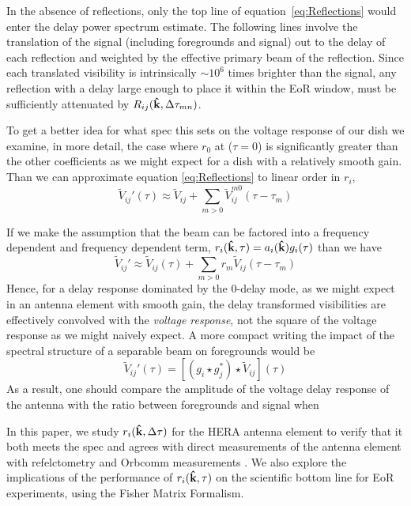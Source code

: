 \documentclass[preprint]{emulateapj}
\begin{document}
In the absence of reflections, only the top line of equation~\ref{eq:Reflections} would enter the delay power spectrum estimate. The following lines involve the translation of the signal (including foregrounds and signal) out to the delay of each reflection and weighted by the effective primary beam of the reflection. Since each translated visibility is intrinsically $\sim 10^6$ times brighter than the signal, any reflection with a delay large enough to place it within the EoR window, must be sufficiently attenuated by $R_{ij}({\bf \hat{k}},\Delta \tau_{mn})$.%

To get a better idea for what spec this sets on the voltage response of our dish we examine, in more detail, the case where $r_0$ at ($\tau=0$) is significantly greater than the other coefficients as we might expect for a dish with a relatively smooth gain. Than we can approximate equation \ref{eq:Reflections} to linear order in $r_i$,
\begin{equation}
\widetilde{V}_{ij}'(\tau) \approx \widetilde{V}_{ij} + \sum_{m>0} \widetilde{V}_{ij}^{m0} (\tau -  \tau_m)
\end{equation}



If we make the assumption that the beam can be factored into a frequency dependent and frequency dependent term, $r_i({\bf \hat{k}},\tau) = a_i({\bf \hat{k}}) g_i(\tau)$ than we have
\begin{equation}
\widetilde{V}_{ij}' \approx \widetilde{V}_{ij}(\tau) + \sum_{m>0} r_m \widetilde{V}_{ij}(\tau - \tau_m)
\end{equation}
 Hence, for a delay response dominated by the $0$-delay mode, as we might expect in an antenna element with smooth gain, the delay transformed visibilities are effectively convolved with the {\it voltage response}, not the square of the voltage response as we might naively expect. A more compact writing the impact of the spectral structure of a separable beam on foregrounds would be
 \begin{equation}
 	\widetilde{V}_{ij}'(\tau) = \left[ (g_i \star g_j^*) \star \widetilde{V}_{ij}\right](\tau)
 \end{equation}
 As a result, one should compare the amplitude of the voltage delay response of the antenna with the ratio between foregrounds and signal when 


 In this paper, we study $r_i({\bf \hat{k}},\Delta \tau)$ for the HERA antenna element to verify that it both meets the spec and agrees with direct measurements of the antenna element with refelctometry \citep{Patra:2015} and Orbcomm measurements \citep{Neben:2015b}. We also explore the implications of the performance of $r_i({\bf \hat{k}},\tau)$ on the scientific bottom line for EoR experiments, using the Fisher Matrix Formalism. 
\end{document}
